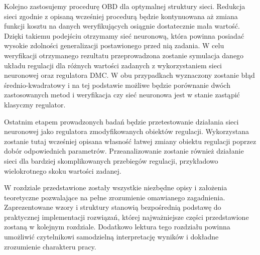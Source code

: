 \par Kolejno zastosujemy procedurę OBD dla optymalnej struktury sieci. Redukcja sieci zgodnie z opisaną wcześniej procedurą będzie kontynuowana aż zmiana funkcji kosztu na danych weryfikujących osiągnie dostatecznie mała wartość. Dzięki takiemu podejściu otrzymamy sieć neuronową, która powinna posiadać wysokie zdolności generalizacji postawionego przed nią zadania. W celu weryfikacji otrzymanego rezultatu przeprowadzona zostanie symulacja danego układu regulacji dla różnych wartości zadanych z wykorzystaniem sieci neuronowej oraz regulatora DMC. W obu przypadkach wyznaczony zostanie błąd średnio-kwadratowy i na tej podstawie możliwe będzie porównanie dwóch zastosowanych metod i weryfikacja czy sieć neuronowa jest w stanie zastąpić klasyczny regulator.
\par Ostatnim etapem prowadzonych badań będzie przetestowanie działania sieci neuronowej jako regulatora zmodyfikowanych obiektów regulacji. Wykorzystana zostanie tutaj wcześniej opisana własność łatwej zmiany obiektu regulacji poprzez dobór odpowiednich parametrów. Przeanalizowanie zostanie również działanie sieci dla bardziej skomplikowanych przebiegów regulacji, przykładowo wielokrotnego skoku wartości zadanej.
\vspace{10mm}
\par W rozdziale przedstawione zostały wszystkie niezbędne opisy i założenia teoretyczne pozwalające na pełne zrozumienie omawianego zagadnienia. Zaprezentowane wzory i struktury stanowią bezpośrednią podstawę do praktycznej implementacji rozwiązań, której najważniejsze części przedstawione zostaną w kolejnym rozdziale. Dodatkowo lektura tego rozdziału powinna umożliwić czytelnikowi samodzielną interpretację wyników i dokładne zrozumienie charakteru pracy.   
      


